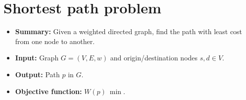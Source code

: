 \section{Shortest path problem}
\begin{itemize}
    \item \textbf{Summary:} Given a weighted directed graph, find the path with least cost from one node to another.
    \item \textbf{Input:} Graph $G=(V,E,w)$ and origin/destination nodes $s, d \in V$.
    \item \textbf{Output:} Path $p$ in $G$.
    \item \textbf{Objective function:} $W(p)~\min$.
\end{itemize}


